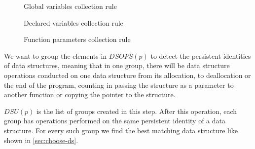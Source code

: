 \documentclass[a4paper,11pt]{article}
\begin{document}
        \begin{figure}[h]
            

            \caption{Global variables collection rule}

            \label{fig:global-collection-rule}
        \end{figure}
        \begin{figure}[h]
            
            \caption{Declared variables collection rule}

            \label{fig:declared-collection-rule}
        \end{figure}
        \begin{figure}[h]
            

            \caption{Function parameters collection rule}

            \label{fig:parameter-collection-rule}
        \end{figure}

        \clearpage


		We want to group the elements in $DSOPS(p)$ to detect the persistent identities \cite{Okasaki} of
		data structures, meaning that in one group, there will be data structure operations conducted on one
		data structure from its allocation, to deallocation or the end of the program, counting in passing the structure as a
		parameter to another function or copying the pointer to the structure.

		$DSU(p)$ is the list of groups created in this step. After this operation, each group has operations performed on the same persistent identity of a data structure. For every such group we find the best matching data structure like shown in 
		\autoref{sec:choose-ds}.
\end{document}
